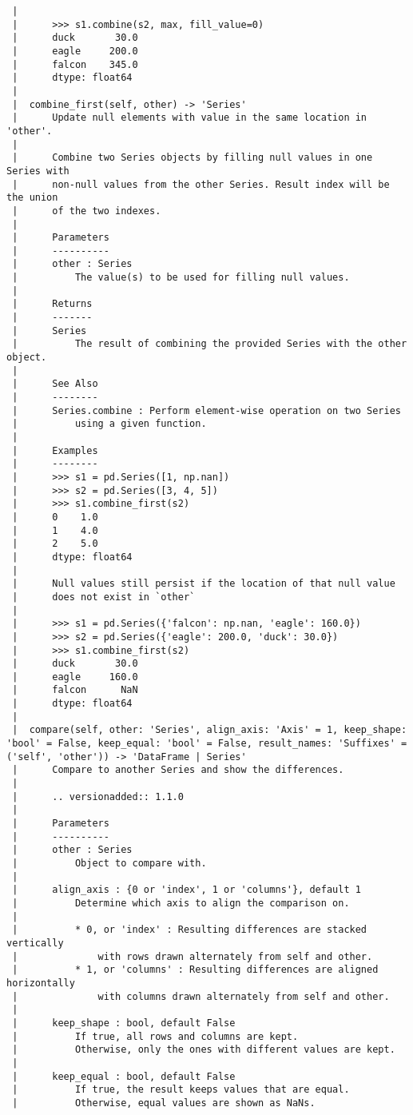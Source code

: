 \documentclass[
  letterpaper,
  DIV=11,
  numbers=noendperiod]{scrreprt}
\begin{document}
\begin{verbatim}
 |      
 |      >>> s1.combine(s2, max, fill_value=0)
 |      duck       30.0
 |      eagle     200.0
 |      falcon    345.0
 |      dtype: float64
 |  
 |  combine_first(self, other) -> 'Series'
 |      Update null elements with value in the same location in 'other'.
 |      
 |      Combine two Series objects by filling null values in one Series with
 |      non-null values from the other Series. Result index will be the union
 |      of the two indexes.
 |      
 |      Parameters
 |      ----------
 |      other : Series
 |          The value(s) to be used for filling null values.
 |      
 |      Returns
 |      -------
 |      Series
 |          The result of combining the provided Series with the other object.
 |      
 |      See Also
 |      --------
 |      Series.combine : Perform element-wise operation on two Series
 |          using a given function.
 |      
 |      Examples
 |      --------
 |      >>> s1 = pd.Series([1, np.nan])
 |      >>> s2 = pd.Series([3, 4, 5])
 |      >>> s1.combine_first(s2)
 |      0    1.0
 |      1    4.0
 |      2    5.0
 |      dtype: float64
 |      
 |      Null values still persist if the location of that null value
 |      does not exist in `other`
 |      
 |      >>> s1 = pd.Series({'falcon': np.nan, 'eagle': 160.0})
 |      >>> s2 = pd.Series({'eagle': 200.0, 'duck': 30.0})
 |      >>> s1.combine_first(s2)
 |      duck       30.0
 |      eagle     160.0
 |      falcon      NaN
 |      dtype: float64
 |  
 |  compare(self, other: 'Series', align_axis: 'Axis' = 1, keep_shape: 'bool' = False, keep_equal: 'bool' = False, result_names: 'Suffixes' = ('self', 'other')) -> 'DataFrame | Series'
 |      Compare to another Series and show the differences.
 |      
 |      .. versionadded:: 1.1.0
 |      
 |      Parameters
 |      ----------
 |      other : Series
 |          Object to compare with.
 |      
 |      align_axis : {0 or 'index', 1 or 'columns'}, default 1
 |          Determine which axis to align the comparison on.
 |      
 |          * 0, or 'index' : Resulting differences are stacked vertically
 |              with rows drawn alternately from self and other.
 |          * 1, or 'columns' : Resulting differences are aligned horizontally
 |              with columns drawn alternately from self and other.
 |      
 |      keep_shape : bool, default False
 |          If true, all rows and columns are kept.
 |          Otherwise, only the ones with different values are kept.
 |      
 |      keep_equal : bool, default False
 |          If true, the result keeps values that are equal.
 |          Otherwise, equal values are shown as NaNs.

\end{verbatim}
\end{document}
